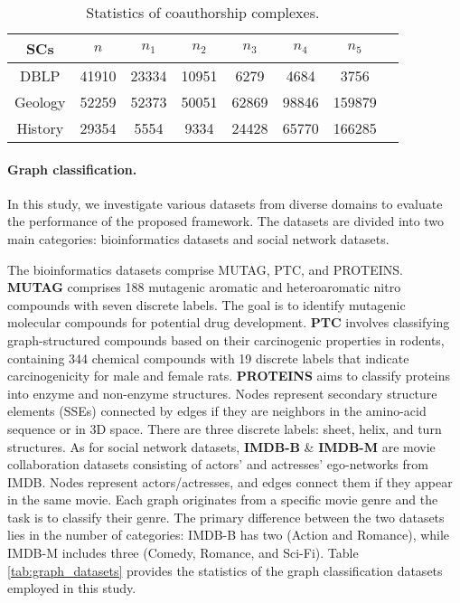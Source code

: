 \documentclass[letterpaper]{article} \usepackage{aaai24}
\theoremstyle{plain}
\theoremstyle{definition}
\theoremstyle{remark}
\begin{document}
\begin{table*}[htbp]
\centering
\begin{tabular}{cccccccc}
\toprule
SCs   & $n$   & $n_1$ & $n_2$   & $n_3$ & $n_4$ &$n_5$ \\  
\midrule
DBLP    &41910  &23334  &10951  &6279   &4684   &3756 \\
Geology &52259  &52373  &50051  &62869  &98846  &159879\\
History &29354  &5554   &9334   &24428  &65770  &166285\\
\bottomrule
\end{tabular}
\caption{Statistics of coauthorship complexes.}
\label{tab:CCs_statistics}
\end{table*}


\paragraph{Graph classification.}
In this study, we  investigate various datasets from diverse domains to evaluate the performance of the proposed framework. The datasets are divided into two main categories: bioinformatics datasets and social network datasets.


The bioinformatics datasets comprise MUTAG, PTC, and PROTEINS.
\textbf{MUTAG} \cite{data:MUTAG} comprises  188 mutagenic aromatic and heteroaromatic nitro compounds with seven discrete labels. The goal is to identify mutagenic molecular compounds for potential drug development.
\textbf{PTC} \cite{data:PTC} involves classifying graph-structured compounds based on their carcinogenic properties in rodents, containing 344 chemical compounds with 19 discrete labels that indicate carcinogenicity for male and female rats.
\textbf{PROTEINS} \cite{data:proteins2005} aims to classify proteins into enzyme and non-enzyme structures. Nodes represent secondary structure elements (SSEs) connected by edges if they are neighbors in the amino-acid sequence or in 3D space. There are three discrete labels: sheet, helix, and turn structures.
As for social network datasets, \textbf{IMDB-B} \& \textbf{IMDB-M} \cite{data:IMDB-REDDIT} are movie collaboration datasets consisting of actors' and actresses' ego-networks from IMDB.  Nodes represent actors/actresses, and edges connect them if they appear in the same movie. Each graph originates from a specific movie genre and the task is to classify their genre. The primary difference between the two datasets lies in the number of categories: IMDB-B has two (Action and Romance), while IMDB-M includes three (Comedy, Romance, and Sci-Fi).
Table \ref{tab:graph_datasets} provides the statistics of the graph classification  datasets employed in this study. 
\end{document}
